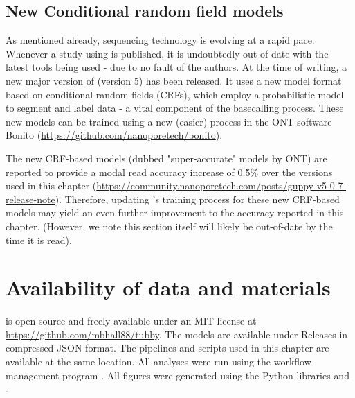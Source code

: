 \subsection{New Conditional random field models}
As mentioned already, \ont{} sequencing technology is evolving at a rapid pace. Whenever a study using \ont{} is published, it is undoubtedly out-of-date with the latest tools being used - due to no fault of the authors. At the time of writing, a new major version of \guppy{} (version 5) has been released. It uses a new model format based on conditional random fields (CRFs), which employ a probabilistic model to segment and label data \cite{Lafferty2001} - a vital component of the basecalling process. These new models can be trained using a new (easier) process in the ONT software Bonito (\url{https://github.com/nanoporetech/bonito}).

The new CRF-based models (dubbed "super-accurate" models by ONT) are reported to provide a modal read accuracy increase of 0.5\% over the \guppy{} versions used in this chapter (\url{https://community.nanoporetech.com/posts/guppy-v5-0-7-release-note}). Therefore, updating \tubby{}'s training process for these new CRF-based models may yield an even further improvement to the accuracy reported in this chapter. (However, we note this section itself will likely be out-of-date by the time it is read). 

\section{Availability of data and materials}


\tubby{} is open-source and freely available under an MIT license at \url{https://github.com/mbhall88/tubby}. The models are available under Releases in compressed JSON format. The pipelines and scripts used in this chapter are available at the same location. All analyses were run using the workflow management program  \cite{snakemake2021}. All figures were generated using the Python libraries  \cite{matplotlib} and  \cite{seaborn}.

